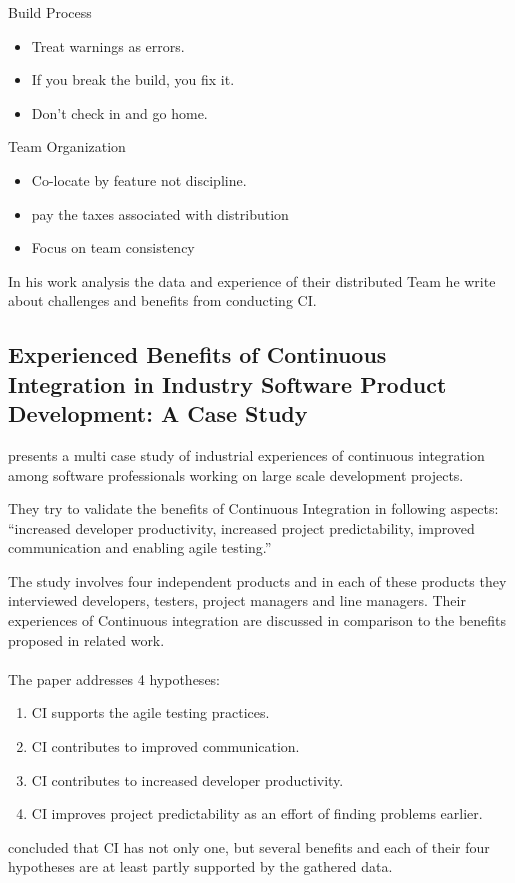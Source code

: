 \noindent Build Process
\begin{itemize}
    \item Treat warnings as errors.
    \item If you break the build, you fix it.
    \item Don't check in and go home.
\end{itemize}
Team Organization
\begin{itemize}
    \item Co-locate by feature not discipline.
    \item pay the taxes associated with distribution
    \item Focus on team consistency
\end{itemize}

\noindent In his work \textcite[]{Miller2008} analysis the data and experience of their distributed Team he write about challenges and benefits from conducting CI.

\subsection*{Experienced Benefits of Continuous Integration in Industry Software Product Development: A Case Study}

\textcite[]{Stahl2013} presents a multi case study of industrial experiences of continuous integration among software professionals working on large scale development projects.

They try to validate the benefits of Continuous Integration in following aspects: ``increased developer productivity, increased project predictability, improved communication and enabling agile testing.''\autocite[]{Stahl2013}

The study involves four independent products and in each of these products they interviewed developers, testers, project managers and line managers. Their experiences of Continuous integration are discussed in comparison to the benefits proposed in related work.
\\
\\
\noindent The paper addresses 4 hypotheses:
\begin{enumerate}
    \item CI supports the agile testing practices.
    \item CI contributes to improved communication.
    \item CI contributes to increased developer productivity.
    \item CI improves project predictability as an effort of finding problems earlier.
\end{enumerate}

\noindent \textcite[]{Stahl2013} concluded that CI has not only one, but several benefits and each of their four hypotheses are at least partly supported by the gathered data.